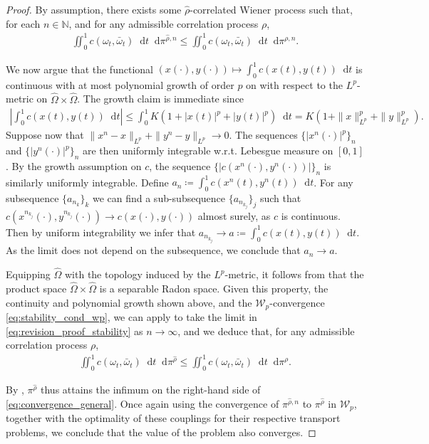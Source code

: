 \documentclass[oneside]{amsart}
\theoremstyle{definition}
\newcommand{\W}{\mathcal W}
\newcommand{\N}{\mathbb N}
\newcommand{\dt}{\mathop{}\!\mathrm{d}t}
\newcommand{\di}{\mathop{}\!\mathrm{d}}
\numberwithin{equation}{section}
\begin{document}
\begin{proof}
	By assumption, there exists some $\hat\rho$-correlated Wiener process such that, for each $n\in\N$, and for any admissible correlation process $\rho$,
	\begin{align}\label{eq:revision_proof_stability}
		\iint_0^1c(\omega_t,\bar\omega_t)\dt\di\pi^{\hat\rho,n}
		\le 	\iint_0^1c(\omega_t,\bar\omega_t)\dt\di\pi^{\rho,n}.
	\end{align}
	
	We now argue that the functional $(x(\cdot),y(\cdot))\mapsto\int_0^1c(x(t),y(t))\dt$ is continuous with at most polynomial growth of order $p$ on with respect to the $L^p$-metric on $\hat \Omega \times \hat \Omega$.
	The growth claim is immediate since
	\begin{align}
		\!\left|\int_0^1c(x(t),y(t))\dt\right|\!
		\le \int_0^1K(1+|x(t)|^p+|y(t)|^p)\dt
		=K(1+\|x\|_{L^p}^p+\|y\|_{L^p}^p).
	\end{align}
	Suppose now that $\|x^n-x\|_{L^p}+\|y^n-y\|_{L^p}\to 0$. The sequences $\{|x^n(\cdot)|^p\}_n$ and $\{|y^n(\cdot)|^p\}_n$ are then uniformly integrable w.r.t. Lebesgue measure on $[0,1]$. By the growth assumption on $c$, the sequence $\{|c(x^n(\cdot),y^n(\cdot))|\}_n$ is similarly uniformly integrable. 
	Define $a_n \coloneqq \int_0^1c(x^n(t),y^n(t))\dt$. For any subsequence $\{a_{n_k}\}_k$ we can find a sub-subsequence $\{a_{n_{k_j}}\}_j$ such that $c(x^{n_{k_j}}(\cdot),y^{n_{k_j}}(\cdot))\to c(x(\cdot),y(\cdot))$ almost surely, as $c$ is continuous. Then by uniform integrability we infer that $a_{n_{k_j}}\to a \coloneqq \int_0^1c(x(t),y(t))\dt$. As the limit does not depend on the subsequence, we conclude that $a_n\to a$.

Equipping $\hat\Omega$ with the topology induced by the $L^p$-metric, it follows from  that the product space $\hat \Omega \times \hat \Omega$ is a separable Radon space. Given this property, the continuity and polynomial growth shown above, and the $\W_p$-convergence \eqref{eq:stability_cond_wp}, we can apply \cite[Lemma~5.1.7 and Proposition~7.1.5]{AGS} to take the limit in \eqref{eq:revision_proof_stability} as $n\to\infty$, and we deduce that, for any admissible correlation process $\rho$, 
\begin{align}
	\iint_0^1c(\omega_t,\bar\omega_t)\dt\di\pi^{\hat\rho}
	\le 	\iint_0^1c(\omega_t,\bar\omega_t)\dt\di\pi^{\rho}.
\end{align}

By , $\pi^{\hat\rho}$ thus attains the infimum on the right-hand side of \eqref{eq:convergence_general}. 
Once again using the convergence of $\pi^{\hat\rho,n}$ to $\pi^{\hat\rho}$ in $\W_p$, together with the optimality of these couplings for their respective transport problems, we conclude that the value of the problem also converges.
\end{proof}
\end{document}
